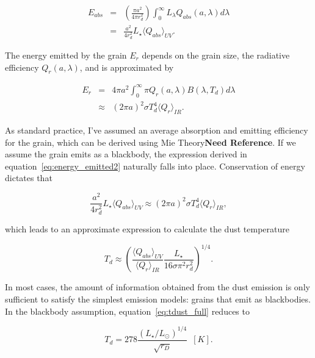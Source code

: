     \begin{eqnarray}\label{eq:energy_absorbed}
    E_{abs} &=& \left(\frac{\pi a^2}{4\pi r_d^2}\right) \int_0^\infty L_{\lambda} Q_{abs}(a,\lambda) d\lambda \\
            &=&  \frac{a^2}{4r_d^2}L_\star \langle Q_{abs}\rangle_{UV}. 
    \end{eqnarray}
    
    \noindent The energy emitted by the grain $E_{r}$ depends on the grain size, the radiative efficiency $Q_{r}(a,\lambda)$, and is approximated by
    
    \begin{eqnarray}
    E_{r} &=& 4\pi a^2 \int_0^\infty \pi Q_{r}(a,\lambda) B(\lambda,T_d)  d\lambda \label{eq:energy_emitted1}\\
          & \approx & \left(2\pi a\right)^2 \sigma T_d^4 \langle Q_{r}\rangle_{IR}. \label{eq:energy_emitted2}
    \end{eqnarray}
            
    
    \noindent As standard practice, I've assumed an average absorption and emitting efficiency for the grain, which can be derived using Mie Theory\textbf{Need Reference}. If we assume the grain emits as a blackbody, the expression derived in equation~\ref{eq:energy_emitted2} naturally falls into place. Conservation of energy dictates that
            
            
    \begin{equation}\label{eq:conserve_energy} 
     \frac{a^2}{4r_d^2}L_\star \langle Q_{abs}\rangle_{UV} \approx \left(2\pi a\right)^2 \sigma T_d^4 \langle Q_{r}\rangle_{IR},
    \end{equation}
            
    \noindent which leads to an approximate expression to calculate the dust temperature
    
    \begin{equation}\label{eq:tdust_full}
    T_d \approx \left(\frac{\langle Q_{abs} \rangle_{UV}}{\langle Q_{r}\rangle_{IR}} \frac{L_\star}{16\sigma \pi^2 r_d^2}\right)^{1/4}.
    \end{equation}
        
    In most cases, the amount of information obtained from the dust emission is only sufficient to satisfy the simplest emission models: grains that emit as blackbodies. In the blackbody assumption, equation~\ref{eq:tdust_full} reduces to 
            
    \begin{equation}\label{eq:blackbody_temp}
            T_d = 278 \frac{\left(L_\star/L_\odot \right)^{1/4}}{\sqrt{r_D}}\enspace [K]. 
    \end{equation}
    
